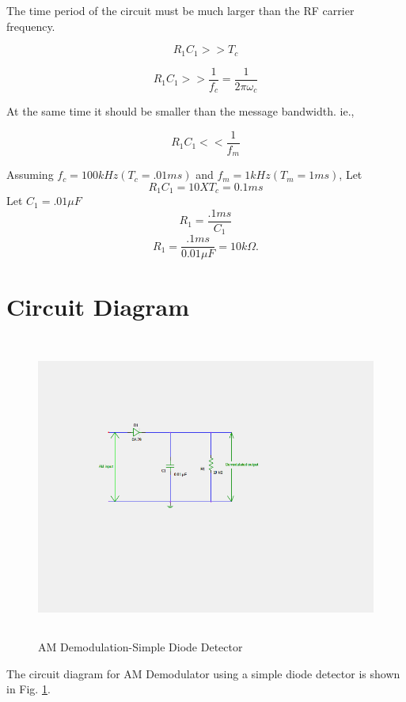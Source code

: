 \documentclass{book}
\begin{document}
\noindent The time period of the circuit must be much larger than the RF carrier frequency.

\begin{equation}
R_1C_1 >> T_c
\end{equation}

\begin{equation}
R_1C_1 >> \frac{1}{f_c} = \frac{1}{2\pi\omega_c}
\end{equation}

\noindent At the same time it should be smaller than the message bandwidth. ie.,

\begin{equation}
R_1C_1<< \frac{1}{f_m}
\end{equation}

\noindent Assuming $f_c=100 kHz(T_c=.01ms)$ and $f_m=1kHz(T_m=1 ms)$,
Let 
\begin{equation}
R_1C_1 = 10 X T_c =0.1 ms
\end{equation}
\noindent Let $C_1=.01\mu F$
\begin{equation}
R_1 = \frac{.1ms}{C_1} 
\end{equation}
\begin{equation}
R_1 = \frac{.1ms}{0.01\mu F}=10 k\Omega. 
\end{equation}
\section*{Circuit Diagram}

\begin{figure}[h]
\includegraphics[width=15cm, height=10cm, trim=5cm 7.5cm 7.5cm 4cm, clip=true]{AMDemod.png}
\caption{AM Demodulation-Simple Diode Detector}
\label{AMDemod} 
\end{figure}
The circuit diagram for AM Demodulator using a simple diode detector is shown in Fig. \ref{AMDemod}.
\end{document}
